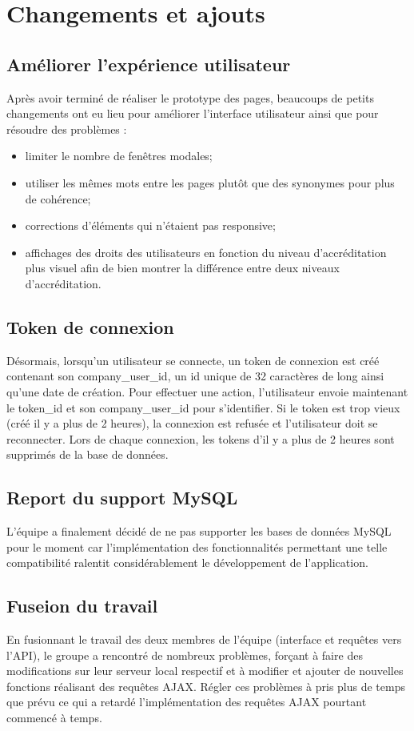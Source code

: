 \documentclass[a4paper, 12pt]{report}
\begin{document}
	\chapter{Changements et ajouts}
		\section{Améliorer l’expérience utilisateur}
			Après avoir terminé de réaliser le prototype des pages, beaucoups de petits changements ont eu lieu pour améliorer l’interface utilisateur ainsi que pour résoudre des problèmes :
			\begin{itemize}
				\item limiter le nombre de fenêtres modales;
				\item utiliser les mêmes mots entre les pages plutôt que des synonymes pour plus de cohérence;
				\item corrections d’éléments qui n’étaient pas responsive;
				\item affichages des droits des utilisateurs en fonction du niveau d’accréditation plus visuel afin de bien montrer la différence entre deux niveaux d’accréditation.

			\end{itemize}

		\section{Token de connexion}
			Désormais, lorsqu’un utilisateur se connecte, un token de connexion est créé contenant son company\_user\_id, un id unique de 32 caractères de long ainsi qu’une date de création. Pour effectuer une action, l’utilisateur envoie maintenant le token\_id et son company\_user\_id pour s’identifier. Si le token est trop vieux (créé il y a plus de 2 heures), la connexion est refusée et l’utilisateur doit se reconnecter. Lors de chaque connexion, les tokens d’il y a plus de 2 heures sont supprimés de la base de données.

		\section{Report du support MySQL}
			L’équipe a finalement décidé de ne pas supporter les bases de données MySQL pour le moment car l’implémentation des fonctionnalités permettant une telle compatibilité ralentit considérablement le développement de l’application.

		\section{Fuseion du travail}
			En fusionnant le travail des deux membres de l’équipe (interface et requêtes vers l’API), le groupe a rencontré de nombreux problèmes, forçant à faire des modifications sur leur serveur local respectif et à modifier et ajouter de nouvelles fonctions réalisant des requêtes AJAX. Régler ces problèmes à pris plus de temps que prévu ce qui a retardé l’implémentation des requêtes AJAX pourtant commencé à temps.
\end{document}

